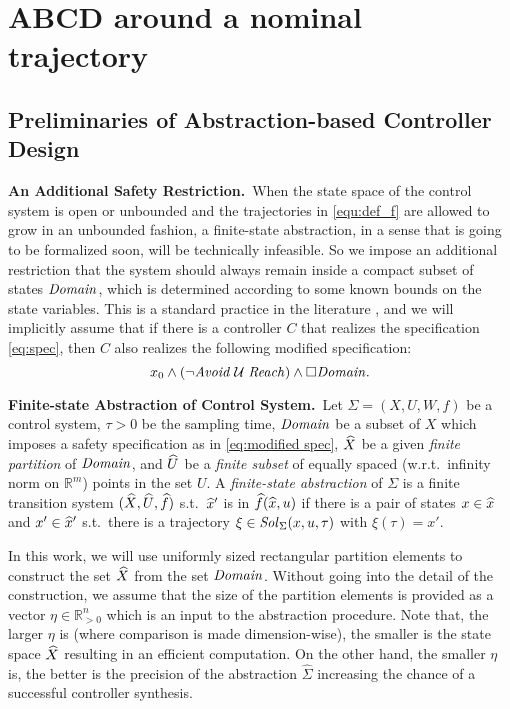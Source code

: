 
\section{ABCD around a nominal trajectory}

\subsection{Preliminaries of Abstraction-based Controller Design}

\smallskip
\noindent\textbf{An Additional Safety Restriction.}\
When the state space of the control system is open or unbounded and the trajectories in \eqref{equ:def_f} are allowed to grow in an unbounded fashion, a finite-state abstraction, in a sense that is going to be formalized soon, will be technically infeasible.
So we impose an additional restriction that the system should always remain inside a compact subset of states $\mathit{Domain}$, which is determined according to some known bounds on the state variables.
This is a standard practice in the literature \cite{reissig2016feedback}, and we will implicitly assume that if there is a controller $C$ that realizes the specification \eqref{eq:spec}, then $C$ also realizes the following modified specification:
\begin{equation}\label{eq:modified spec}
	x_0 \wedge (\lnot \mathit{Avoid} \; \mathcal{U} \; \mathit{Reach}) \wedge \square \mathit{Domain}.
\end{equation}

\smallskip
\noindent\textbf{Finite-state Abstraction of Control System.}\
Let $\Sigma = (X, U, W, f)$ be a control system, $\tau>0$ be the sampling time, $\mathit{Domain}$ be a subset of $X$ which imposes a safety specification as in \eqref{eq:modified spec}, $\widehat{X}$ be a given \emph{finite partition} of $\mathit{Domain}$, and $\widehat{U}$ be a \emph{finite subset} of equally spaced (w.r.t.\ infinity norm on $\mathbb{R}^m$) points in the set $U$.
A \emph{finite-state abstraction} of $\Sigma$ is a finite transition system $(\widehat{X},\widehat{U},\widehat{f})$ s.t.\ $\widehat{x}'$ is in $\widehat{f}(\widehat{x},u)$ if there is a pair of states $x\in \widehat{x}$ and $x'\in \widehat{x}'$ s.t.\ there is a trajectory $\xi\in \mathit{Sol}_\Sigma(x,u,\tau)$ with $\xi(\tau)=x'$.

In this work, we will use uniformly sized rectangular partition elements to construct the set $\widehat{X}$ from the set $\mathit{Domain}$.
Without going into the detail of the construction, we assume that the size of the partition elements is provided as a vector $\eta\in \mathbb{R}^n_{>0}$ which is an input to the abstraction procedure.
Note that, the larger $\eta$ is (where comparison is made dimension-wise), the smaller is the state space $\widehat{X}$ resulting in an efficient computation.
On the other hand, the smaller $\eta$ is, the better is the precision of the abstraction $\widehat{\Sigma}$ increasing the chance of a successful controller synthesis.

